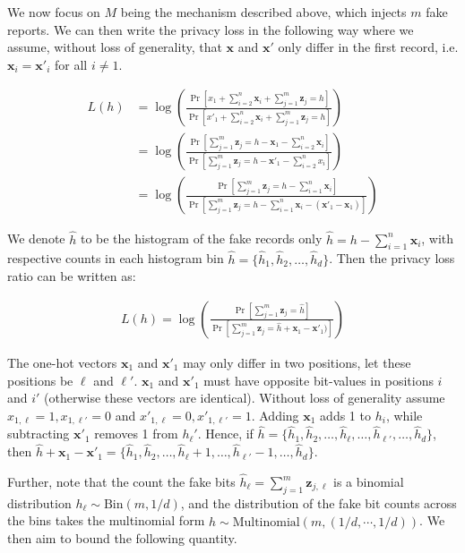 \documentclass[11pt]{article}
\newcommand{\bbx}{\pmb{x}}
\newcommand{\bbz}{\pmb{z}}
\begin{document}
We now focus on $M$ being the mechanism described above, which injects $m$ fake reports. We can then write the privacy loss in the following way where we assume, without loss of generality, that $\bbx$ and $\bbx'$ only differ in the first record, i.e. $\bbx_i = \bbx'_i$ for all $i \ne 1$.

\begin{align*}
L(h) &= \log \left ( \frac{\Pr[x_1 + \sum^n_{i=2} \bbx_i + \sum^m_{j=1} \bbz_j = h]}{\Pr[x'_1 + \sum^n_{i=2} \bbx_i + \sum^m_{j=1} \bbz_j = h]} \right ) \\
&=  \log \left ( \frac{\Pr[\sum^m_{j=1} \bbz_j = h - \bbx_1 - \sum^n_{i=2} \bbx_i ]}{\Pr[ \sum^m_{j=1} \bbz_j = h - \bbx'_1 - \sum^n_{i=2} x_i ]} \right )  \\
&=  \log \left ( \frac{\Pr[\sum^m_{j=1} \bbz_j = h - \sum^n_{i=1}  \bbx_i ]}{\Pr[ \sum^m_{j=1} \bbz_j = h  - \sum^n_{i=1} \bbx_i  - (\bbx'_1 - \bbx_1) ]} \right )
\end{align*}

We denote  $\hat{h}$ to be the histogram of the fake records only $\hat{h} = h - \sum^n_{i=1} \bbx_i$, with respective counts in each histogram bin $\hat{h} = \{ \hat{h}_1, \hat{h}_2, \dots , \hat{h}_d\}$.  Then the privacy loss ratio can be written as:

\begin{align*}
L(h) =  \log \left ( \frac{\Pr[\sum^m_{j=1} \bbz_j = \hat{h} ]}{\Pr[ \sum^m_{j=1} \bbz_j = \hat{h}  + \bbx_1 - \bbx'_1) ]} \right )
\end{align*}



The one-hot vectors $\bbx_1$  and $\bbx'_1$ may only differ in two positions, let these positions be $\ell$ and $\ell'$. 
$\bbx_1$ and $\bbx'_1$ must have opposite bit-values in positions $i$ and $i'$ (otherwise these vectors are identical). 
Without loss of generality assume $x_{1,\ell} = 1, x_{1,\ell'} = 0$ and $x'_{1,\ell} = 0, x'_{1,\ell'} = 1$.  
Adding $\bbx_1$ adds 1 to $h_i$, while subtracting $\bbx'_1$ removes 1 from $h_\ell'$.
Hence,  if $\hat{h} = \{ \hat{h}_1, \hat{h}_2, \dots , \hat{h}_\ell, \dots, \hat{h}_{\ell'}, \dots, \hat{h}_d\} $, then  $\hat{h} + \bbx_1 -\bbx'_1 =  \{ \hat{h}_1, \hat{h}_2, \dots , \hat{h}_\ell + 1, \dots, \hat{h}_{\ell'} -1, \dots, \hat{h}_d\} $.

Further, note that the count the fake bits $\hat{h}_\ell = \sum^m_{j=1} \bbz_{j,\ell}$ is a binomial distribution $h_\ell \sim \text{Bin}(m, 1/d)$, and the distribution of the fake bit counts across the bins takes the multinomial form $ \hat{h} \sim \text{Multinomial}(m,(1/d,\cdots, 1/d))$. We then aim to bound the following quantity.
\end{document}
